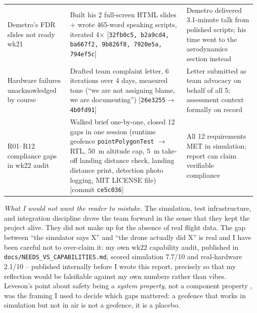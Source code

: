 {\begin{tabularx}{\textwidth}{@{}p{3.4cm} X p{4.3cm}@{}}
Demetro's FDR slides not ready wk21 & Built his 2 full-screen HTML slides + wrote 465-word speaking scripts, iterated 4$\times$ [\texttt{32fb0c5, b2a9cd4, ba667f2, 9b826f8, 7920e5a, 794ef5c}] & Demetro delivered 3.1-minute talk from polished scripts; his time went to the aerodynamics section instead \\
Hardware failures unacknowledged by course & Drafted team complaint letter, 6 iterations over 4 days, measured tone (``we are not assigning blame, we are documenting'') [\texttt{26e3255}$\to$\texttt{4b0fd91}] & Letter submitted as team advocacy on behalf of all 5; assessment context formally on record \\
R01--R12 compliance gaps in wk22 audit & Walked brief one-by-one, closed 12 gaps in one session (runtime geofence \texttt{pointPolygonTest} $\to$ RTL, 50~m altitude cap, 5~m take-off landing distance check, landing distance print, detection photo logging, MIT LICENSE file) [commit \texttt{ce5c036}] & All 12 requirements MET in simulation; report can claim verifiable compliance \\
\bottomrule
\end{tabularx}}

\textit{What I would not want the reader to mistake.}  The simulation, test infrastructure, and integration discipline drove the team forward in the sense that they kept the project alive. They did not make up for the absence of real flight data. The gap between ``the simulator says X'' and ``the drone actually did X'' is real and I have been careful not to over-claim it: my own wk22 capability audit, published in \texttt{docs/NEEDS\_VS\_CAPABILITIES.md}, scored simulation 7.7/10 and real-hardware 2.1/10 -- published internally before I wrote this report, precisely so that my reflection would be falsifiable against my own numbers rather than vibes. Leveson's point about safety being a \textit{system property}, not a component property \cite{leveson2011}, was the framing I used to decide which gaps mattered: a geofence that works in simulation but not in air is not a geofence, it is a placebo.

